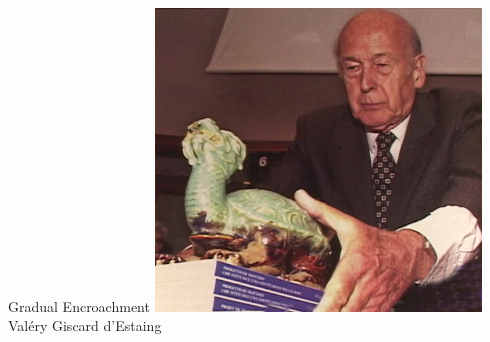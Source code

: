 \begin{frame}{Gradual Encroachment}
    \centering
    \includegraphics[width=0.65\textwidth]{img/french-pres.png} \\
    Val\'{e}ry Giscard d'Estaing \\
\end{frame}

